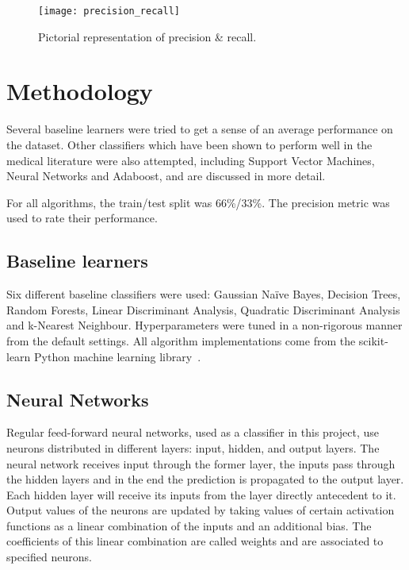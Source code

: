 \documentclass[conference]{IEEEtran}
\begin{document}
\begin{figure}[htpb]
	\centering
	\texttt{[image: precision\_recall]}
	\caption{Pictorial representation of precision \& recall.}
	\label{fig:precision_recall}
\end{figure}

\section{Methodology}

Several baseline learners were tried to get a sense of an average performance on the dataset. Other classifiers which have been shown to perform well in the medical literature were also attempted, including Support Vector Machines, Neural Networks and Adaboost, and are discussed in more detail.

For all algorithms, the train/test split was 66\%/33\%. The precision metric was used to rate their performance.

\subsection{Baseline learners}

Six different baseline classifiers were used: Gaussian Naïve Bayes, Decision Trees, Random Forests, Linear Discriminant Analysis, Quadratic Discriminant Analysis and k-Nearest Neighbour. Hyperparameters were tuned in a non-rigorous manner from the default settings. All algorithm implementations come from the scikit-learn Python machine learning library~\cite{scikit-learn}.

\subsection{Neural Networks}

Regular feed-forward neural networks, used as a classifier in this project, use neurons distributed in different layers: input, hidden, and output layers. The neural network receives input through the former layer, the inputs pass through the hidden layers and in the end the prediction is propagated to the output layer. Each hidden layer will receive its inputs from the layer directly antecedent to it. Output values of the neurons are updated by taking values of certain activation functions as a linear combination of the inputs and an additional bias. The coefficients of this linear combination are called weights and are associated to specified neurons.
\end{document}
